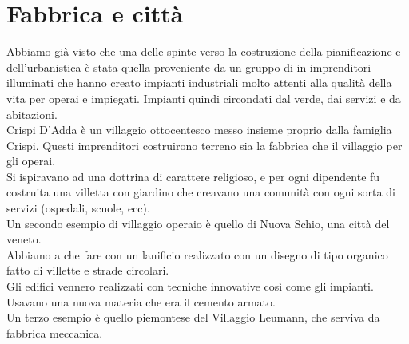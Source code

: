 \documentclass[a4paper,12pt, oneside]{book}
\begin{document}
  \section{Fabbrica e città}
  Abbiamo già visto che una delle spinte verso la costruzione della pianificazione e dell'urbanistica è stata quella proveniente da un gruppo di in imprenditori illuminati che hanno creato impianti industriali molto attenti alla qualità della vita per operai e impiegati. Impianti quindi circondati dal verde, dai servizi e da abitazioni.\\
  Crispi D'Adda è un villaggio ottocentesco messo insieme proprio dalla famiglia Crispi. Questi imprenditori costruirono 
  terreno sia la fabbrica che il villaggio per gli operai.\\ 
  Si ispiravano ad una dottrina di carattere religioso, e per ogni dipendente fu costruita una villetta con giardino che creavano una comunità con ogni sorta di servizi (ospedali, scuole, ecc).\\
  Un secondo esempio di villaggio operaio è quello di Nuova Schio, una città del veneto.\\ Abbiamo a che fare con un lanificio realizzato con un disegno di tipo organico fatto di villette e strade circolari.\\
  Gli edifici vennero realizzati con tecniche innovative così come gli impianti. Usavano una nuova materia che era il cemento armato.\\
  Un terzo esempio è quello piemontese del Villaggio Leumann, che serviva da fabbrica meccanica.\\
\end{document}
